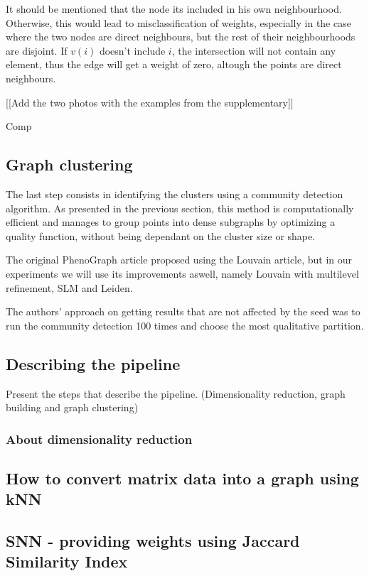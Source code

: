     It should be mentioned that the node its included in his own neighbourhood. Otherwise, this would lead to misclassification of weights, especially in the case where the two nodes are direct neighbours, but the rest of their neighbourhoods are disjoint. If $v(i)$ doesn't include $i$, the intersection will not contain any element, thus the edge will get a weight of zero, altough the points are direct neighbours. 

    [[Add the two photos with the examples from the supplementary]]


    Comp

    \subsection{Graph clustering}
    The last step consists in identifying the clusters using a community detection algorithm. As presented in the previous section, this method is computationally efficient and manages to group points into dense subgraphs by optimizing a quality function, without being dependant on the cluster size or shape.

    The original PhenoGraph article proposed using the Louvain article, but in our experiments we will use its improvements aswell, namely Louvain with multilevel refinement, SLM and Leiden. 

    The authors' approach on getting results that are not affected by the seed was to run the community detection 100 times and choose the most qualitative partition.

    \subsection{Describing the pipeline}
    Present the steps that describe the pipeline. (Dimensionality reduction, graph building and graph clustering)
    \subsubsection{About dimensionality reduction}
    
    \subsection{How to convert matrix data into a graph using kNN}
    \subsection{SNN - providing weights using Jaccard Similarity Index}
    

